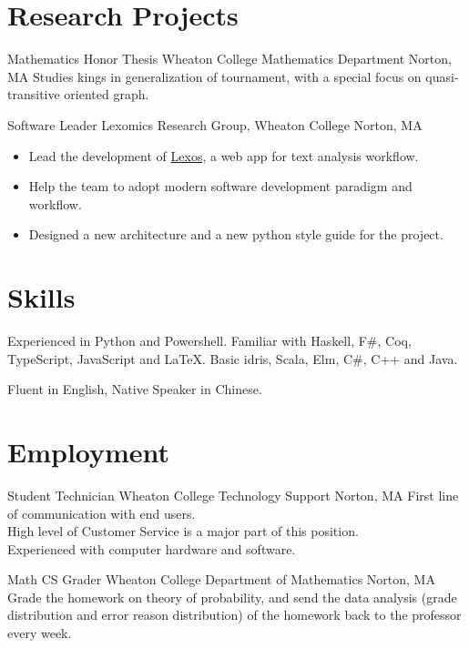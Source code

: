 \documentclass[11pt,a4paper,roman]{moderncv}        %
\begin{document}
\section{Research Projects}

{Mathematics Honor Thesis}
{Wheaton College Mathematics Department}
{Norton, MA}{}
{Studies kings in generalization of tournament,
with a special focus on quasi-transitive oriented graph.}

{Software Leader}
{Lexomics Research Group, Wheaton College}
{Norton, MA}{}
{
  \begin{itemize}
    \item
      Lead the development of \href{https://github.com/WheatonCS/Lexos}{Lexos}, a web app for text analysis workflow.
    \item
      Help the team to adopt modern software development paradigm and workflow.
    \item
      Designed a new architecture and a new python style guide for the project.
  \end{itemize}
}



\section{Skills}

{Experienced in Python and Powershell.
Familiar with Haskell, F\#, Coq, TypeScript, JavaScript and \LaTeX{}.
Basic idris, Scala, Elm, C\#, C++ and Java.}

{Fluent in English, Native Speaker in Chinese.}



\section{Employment}
{Student Technician}
{Wheaton College Technology Support}
{Norton, MA}{}
{First line of communication with end users.\\
High level of Customer Service is a major part of this position.\\
Experienced with computer hardware and software.}

{Math CS Grader}
{Wheaton College Department of Mathematics}
{Norton, MA}{}
{Grade the homework on theory of probability,
and send the data analysis (grade distribution and error reason distribution)
of the homework back to the professor every week.}
\end{document}
